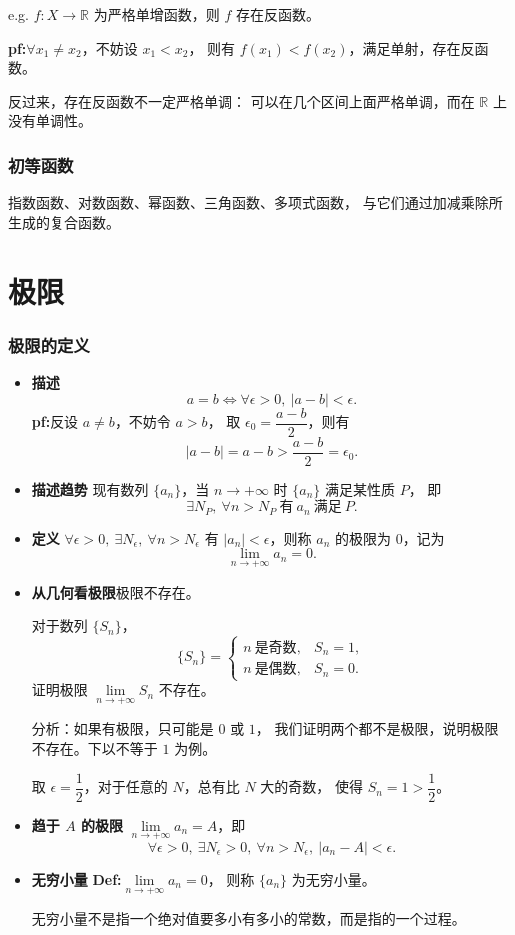 \documentclass[UTF8,11pt]{ctexart}
\theoremstyle{cnthm}
\begin{document}
e.g. $f:X\to\mathbb R$ 为严格单增函数，则 $f$ 存在反函数。

\textbf{pf:}\quad $\forall x_1\neq x_2$，不妨设 $x_1<x_2$，
则有 $f(x_1)<f(x_2)$，满足单射，存在反函数。

反过来，存在反函数不一定严格单调：
可以在几个区间上面严格单调，而在 $\mathbb R$ 上没有单调性。

\subsubsection*{初等函数}

指数函数、对数函数、幂函数、三角函数、多项式函数，
与它们通过加减乘除所生成的复合函数。

\section{极限}

\subsubsection*{极限的定义}

\begin{itemize}
\item \textbf{描述}\quad
\[
a=b\iff\forall\epsilon>0,\ |a-b|<\epsilon .
\]
\textbf{pf:}\quad 反设 $a\neq b$，不妨令 $a>b$，
取 $\epsilon_0=\dfrac{a-b}{2}$，则有
\[
|a-b|=a-b>\frac{a-b}{2}=\epsilon_0 .
\]

\item \textbf{描述趋势}\quad
现有数列 $\{a_n\}$，当 $n\to+\infty$ 时 $\{a_n\}$ 满足某性质 $P$，
即
\[
\exists N_P,\ \forall n>N_P\ \text{有}\ a_n\ \text{满足}\ P .
\]

\item \textbf{定义}\quad
$\forall\epsilon>0,\ \exists N_\epsilon,\ \forall n>N_\epsilon$ 有
$|a_n|<\epsilon$，则称 $a_n$ 的极限为 $0$，记为
\[
\lim_{n\to+\infty}a_n=0 .
\]

\item \textbf{从几何看极限}\quad 极限不存在。

对于数列 $\{S_n\}$，
\[
\{S_n\}=
\begin{cases}
n\ \text{是奇数}, & S_n=1,\\
n\ \text{是偶数}, & S_n=0 .
\end{cases}
\]
证明极限 $\lim\limits_{n\to+\infty}S_n$ 不存在。

分析：如果有极限，只可能是 $0$ 或 $1$，
我们证明两个都不是极限，说明极限不存在。下以不等于 $1$ 为例。

取 $\epsilon=\dfrac12$，对于任意的 $N$，总有比 $N$ 大的奇数，
使得 $S_n=1>\dfrac12$。

\item \textbf{趋于 $A$ 的极限}\quad
$\lim\limits_{n\to+\infty}a_n=A$，即
\[
\forall\epsilon>0,\ \exists N_\epsilon>0,\ \forall n>N_\epsilon,\
|a_n-A|<\epsilon .
\]

\item \textbf{无穷小量}\quad
\textbf{Def:}\quad $\lim\limits_{n\to+\infty}a_n=0$，
则称 $\{a_n\}$ 为无穷小量。

无穷小量不是指一个绝对值要多小有多小的常数，而是指的一个过程。
\end{itemize}
\end{document}
